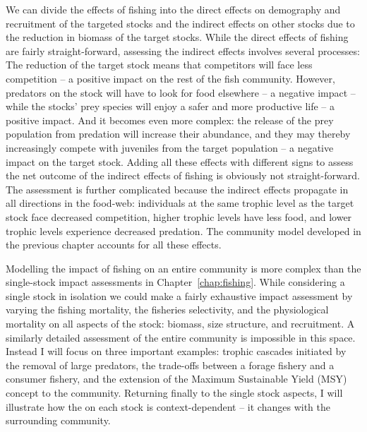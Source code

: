 We can divide the effects of fishing into the direct effects on demography and recruitment of the targeted stocks and the indirect effects on other stocks due to the reduction in biomass of the target stocks.  While the direct effects of fishing are fairly straight-forward, assessing the indirect effects involves several processes:  The reduction of the target stock means that competitors will face less competition -- a positive impact on the rest of the fish community.  However, predators on the stock will have to look for food elsewhere -- a negative impact -- while the stocks' prey species will enjoy a safer and more productive life -- a positive impact.  And it becomes even more complex: the release of the prey population from predation will increase their abundance, and they may thereby increasingly compete with juveniles from the target population -- a negative impact on the target stock.  Adding all these effects with different signs to assess the net outcome of the indirect effects of fishing is obviously not straight-forward.   The assessment is further complicated because the indirect effects propagate in all directions in the food-web: individuals at the same trophic level as the target stock face decreased competition, higher trophic levels have less food, and lower trophic levels experience decreased predation.  The community model developed in the previous chapter accounts for all these effects.

Modelling the impact of fishing on an entire community is more complex than the single-stock impact assessments in Chapter~\ref{chap:fishing}.  While considering a single stock in isolation we could make a fairly exhaustive impact assessment by varying the fishing mortality, the fisheries selectivity, and the physiological mortality on all aspects of the stock: biomass, size structure, and recruitment.  A similarly detailed assessment of the entire community is impossible  in this space.  Instead I will focus on three important examples: trophic cascades initiated by the removal of large predators, the trade-offs between a forage fishery and a consumer fishery, and the extension of the Maximum Sustainable Yield (MSY) concept to the community.  Returning finally to the single stock aspects, I will illustrate how the {\Fmsy} on each stock is context-dependent -- it changes with the surrounding community.



